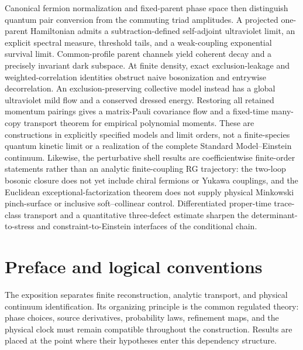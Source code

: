 \documentclass[11pt,a4paper,oneside]{book}
\theoremstyle{plain}
\theoremstyle{definition}
\theoremstyle{remark}
\begin{document}
Canonical fermion normalization and fixed-parent phase space then distinguish quantum pair conversion from the commuting triad amplitudes.  A projected one-parent Hamiltonian admits a subtraction-defined self-adjoint ultraviolet limit, an explicit spectral measure, threshold tails, and a weak-coupling exponential survival limit.  Common-profile parent channels yield coherent decay and a precisely invariant dark subspace.  At finite density, exact exclusion-leakage and weighted-correlation identities obstruct naive bosonization and entrywise decorrelation.  An exclusion-preserving collective model instead has a global ultraviolet mild flow and a conserved dressed energy.  Restoring all retained momentum pairings gives a matrix-Pauli covariance flow and a fixed-time many-copy transport theorem for empirical polynomial moments.  These are constructions in explicitly specified models and limit orders, not a finite-species quantum kinetic limit or a realization of the complete Standard Model--Einstein continuum.  Likewise, the perturbative shell results are coefficientwise finite-order statements rather than an analytic finite-coupling RG trajectory: the two-loop bosonic closure does not yet include chiral fermions or Yukawa couplings, and the Euclidean exceptional-factorization theorem does not supply physical Minkowski pinch-surface or inclusive soft--collinear control.  Differentiated proper-time trace-class transport and a quantitative three-defect estimate sharpen the determinant-to-stress and constraint-to-Einstein interfaces of the conditional chain.

\chapter*{Preface and logical conventions}
The exposition separates finite reconstruction, analytic transport, and
physical continuum identification.  Its organizing principle is the common
regulated theory: phase choices, source derivatives, probability laws,
refinement maps, and the physical clock must remain compatible throughout
the construction.  Results are placed at the point where their hypotheses
enter this dependency structure.
\end{document}
